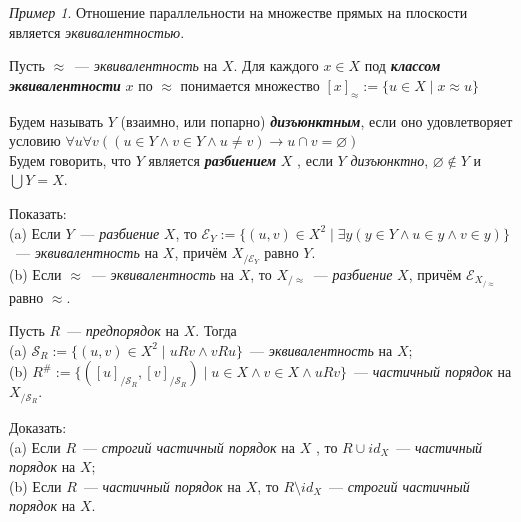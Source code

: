 \documentclass{article}
\theoremstyle{remark}
\newtheorem{example}{Пример}
\begin{document}
\begin{example}
	Отношение параллельности на множестве прямых на плоскости является \textit{эквивалентностью}.
\end{example}

\begin{definition}
	Пусть $\approx$~--- \textit{эквивалентность} на $X$. Для каждого $x \in X$ под \textit{\textbf{классом эквивалентности}} $x$ по $\approx$ понимается множество
	$[x]_\approx :=\{u\in X \mid x\approx u\}$
\end{definition}

\begin{definition}
	Будем называть $Y$ (взаимно, или попарно) \textit{\textbf{дизъюнктным}}, если оно удовлетворяет условию $\forall u\forall v((u\in Y \wedge v\in Y \wedge u\neq v)\rightarrow u \cap v=\varnothing)$\\
%
	Будем говорить, что $Y$ является \textit{\textbf{разбиением}} $X$ , если $Y$ \textit{дизъюнктно}, $\varnothing \notin Y$ и $\bigcup Y = X$.
\end{definition}


\begin{task}
	Показать:\\
	(a) Если $Y$~--- \textit{разбиение} $X$, то
	$\mathscr{E}_Y :=\{(u,v)\in X^2 \mid \exists y(y\in Y \wedge u\in y\wedge v\in y)\}$~--- \textit{эквивалентность} на $X$, причём $X_{/\mathscr{E}_Y}$ равно $Y$.\\
	(b) Если $\approx$~--- \textit{эквивалентность} на $X$, то $X_{/\approx}$~--- \textit{разбиение} $X$, причём $\mathscr{E}_{X_{/\approx}}$ равно $\approx$.
	
\end{task}
	
\begin{task}
Пусть $R$~--- \textit{предпорядок} на $X$. Тогда\\
(a) $\mathscr{S}_R := \{(u, v) \in X^2 \mid  uRv \wedge vRu\}$~--- \textit{эквивалентность} на $X$;\\
(b) $R^\# :=\{([u]_{/\mathscr{S}_R},[v]_{/\mathscr{S}_R})\mid u\in X\wedge v\in X\wedge uRv\}$~--- \textit{частичный порядок }на $X_{/\mathscr{S}_R}.$ 
\end{task} 

\begin{task}
Доказать:\\
(a) Если $R$~--- \textit{строгий частичный порядок} на $X$ , то $R \cup id_X$~--- \textit{частичный порядок} на $X$; \\
(b) Если $R$~--- \textit{частичный порядок} на $X$, то $R \setminus id_X$~--- \textit{строгий частичный порядок} на $X$.
\end{task}
\end{document}
